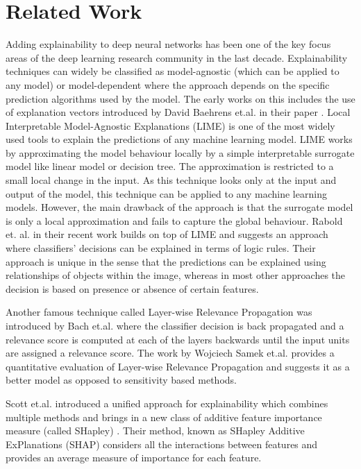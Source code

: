 \documentclass{bmvc2k}
\begin{document}
\section{Related Work}
Adding explainability to deep neural networks has been one of the key focus areas of the deep learning research community in the last decade.
Explainability techniques can widely be classified as model-agnostic (which can be applied to any model) or model-dependent where the approach depends on the specific prediction algorithms used by the model.
The early works on this includes the use of explanation vectors introduced by David Baehrens et.al. in their paper \cite{baehrens2010explain}.
Local Interpretable Model-Agnostic Explanations (LIME) \cite{ribeiro2016should} is one of the most widely used tools to explain the predictions of any machine learning model.
LIME works by approximating the model behaviour locally by a simple interpretable surrogate model like linear model or decision tree. The approximation is restricted to a small local change in the input. As this technique looks only at the input and output of the model, this technique can be applied to any machine learning models.
However, the main drawback of the approach is that the surrogate model is only a local approximation and fails to capture the global behaviour.
Rabold et. al. in their recent work \cite{rabold2019enriching} builds on top of LIME and suggests an approach where classifiers' decisions can be explained in terms of logic rules. Their approach is unique in the sense that the predictions can be explained using relationships of objects within the image, whereas in most other approaches the decision is based on presence or absence of certain features.

Another famous technique called Layer-wise Relevance Propagation was introduced by Bach et.al. \cite{bach2015pixel} where the classifier decision is  back propagated and a relevance score is computed at each of the layers backwards until the input units are assigned a relevance score.
The work by Wojciech Samek et.al. \cite{samek2016evaluating} provides a quantitative  evaluation of Layer-wise Relevance Propagation and  suggests it as a better model as opposed to sensitivity based methods.

Scott et.al. introduced a unified approach for explainability which combines multiple methods and brings in a new class of additive feature importance measure (called SHapley) \cite{lundberg2017unified}.
Their method, known as SHapley Additive ExPlanations (SHAP) considers all  the interactions between features and provides an average measure of importance for each feature.
\end{document}
